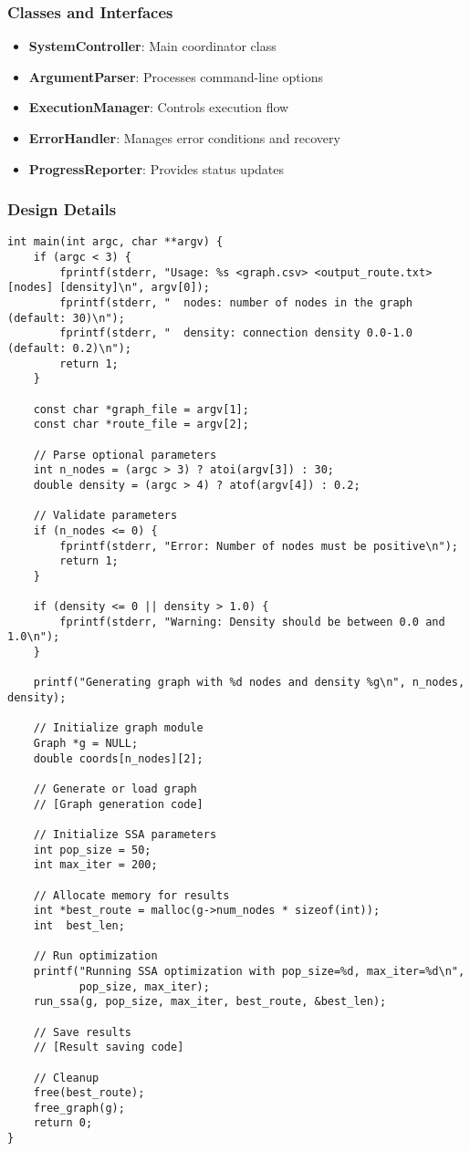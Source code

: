 \documentclass[conference]{IEEEtran}
\begin{document}
\subsubsection{Classes and Interfaces}
\begin{itemize}
    \item \textbf{SystemController}: Main coordinator class
    \item \textbf{ArgumentParser}: Processes command-line options
    \item \textbf{ExecutionManager}: Controls execution flow
    \item \textbf{ErrorHandler}: Manages error conditions and recovery
    \item \textbf{ProgressReporter}: Provides status updates
\end{itemize}

\subsubsection{Design Details}
\begin{lstlisting}[caption=Main System Controller Function]
int main(int argc, char **argv) {
    if (argc < 3) {
        fprintf(stderr, "Usage: %s <graph.csv> <output_route.txt> [nodes] [density]\n", argv[0]);
        fprintf(stderr, "  nodes: number of nodes in the graph (default: 30)\n");
        fprintf(stderr, "  density: connection density 0.0-1.0 (default: 0.2)\n");
        return 1;
    }

    const char *graph_file = argv[1];
    const char *route_file = argv[2];

    // Parse optional parameters
    int n_nodes = (argc > 3) ? atoi(argv[3]) : 30;
    double density = (argc > 4) ? atof(argv[4]) : 0.2;

    // Validate parameters
    if (n_nodes <= 0) {
        fprintf(stderr, "Error: Number of nodes must be positive\n");
        return 1;
    }

    if (density <= 0 || density > 1.0) {
        fprintf(stderr, "Warning: Density should be between 0.0 and 1.0\n");
    }

    printf("Generating graph with %d nodes and density %g\n", n_nodes, density);

    // Initialize graph module
    Graph *g = NULL;
    double coords[n_nodes][2];

    // Generate or load graph
    // [Graph generation code]

    // Initialize SSA parameters
    int pop_size = 50;
    int max_iter = 200;

    // Allocate memory for results
    int *best_route = malloc(g->num_nodes * sizeof(int));
    int  best_len;

    // Run optimization
    printf("Running SSA optimization with pop_size=%d, max_iter=%d\n",
           pop_size, max_iter);
    run_ssa(g, pop_size, max_iter, best_route, &best_len);

    // Save results
    // [Result saving code]

    // Cleanup
    free(best_route);
    free_graph(g);
    return 0;
}
\end{lstlisting}
\end{document}
